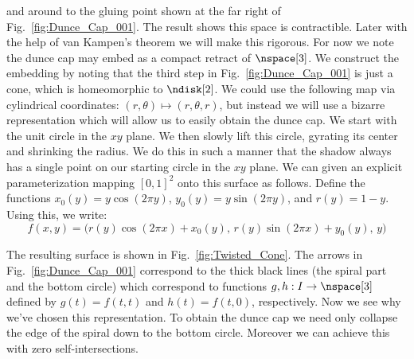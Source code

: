         and around to the gluing point shown at the far right of
        Fig.~\ref{fig:Dunce_Cap_001}. The result shows this space is
        contractible. Later with the help of van Kampen's theorem we
        will make this rigorous. For now we note the dunce cap may embed
        as a compact retract of $\nspace[3]$. We construct the embedding
        by noting that the third step in Fig.~\ref{fig:Dunce_Cap_001} is
        just a cone, which is homeomorphic to $\ndisk[2]$. We could use
        the following map via cylindrical coordinates:
        $(r,\theta)\mapsto(r,\theta,r)$, but instead we will use a
        bizarre representation which will allow us to easily obtain the
        dunce cap. We start with the unit circle in the $xy$ plane. We
        then slowly lift this circle, gyrating its center and shrinking
        the radius. We do this in such a manner that the shadow always
        has a single point on our starting circle in the $xy$ plane. We
        can given an explicit parameterization mapping $[0,1]^{2}$ onto
        this surface as follows. Define the functions
        $x_{0}(y)=y\cos(2\pi{y})$,
        $y_{0}(y)=y\sin(2\pi{y})$, and $r(y)=1-y$. Using this, we write:
        \begin{equation}
            \label{eqn:Func_for_Twisted_Cone}
            f(x,y)=\big(
                r(y)\cos(2\pi{x})+x_{0}(y),\,
                r(y)\sin(2\pi{x})+y_{0}(y),\,
                y
            \big)
        \end{equation}
        \par
        \begin{minipage}[b]{0.54\textwidth}
            The resulting surface is shown in
            Fig.~\ref{fig:Twisted_Cone}. The arrows in
            Fig.~\ref{fig:Dunce_Cap_001} correspond to the thick black
            lines (the spiral part and the bottom circle) which
            correspond to functions $g,h:I\rightarrow\nspace[3]$ defined
            by $g(t)=f(t,t)$ and $h(t)=f(t,0)$, respectively. Now we see
            why we've chosen this representation. To obtain the dunce
            cap we need only collapse the edge of the spiral down to the
            bottom circle. Moreover we can achieve this with zero
            self-intersections.
        \end{minipage}
        \hfill
